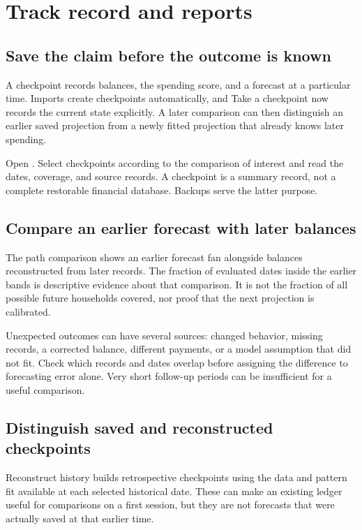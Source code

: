 \chapter{Track record and reports}\label{ch:track}
\section{Save the claim before the outcome is known}
A checkpoint records balances, the spending score, and a forecast at a particular time. Imports create checkpoints automatically, and Take a checkpoint now records the current state explicitly. A later comparison can then distinguish an earlier saved projection from a newly fitted projection that already knows later spending.

Open . Select checkpoints according to the comparison of interest and read the dates, coverage, and source records. A checkpoint is a summary record, not a complete restorable financial database. Backups serve the latter purpose.

\section{Compare an earlier forecast with later balances}
The path comparison shows an earlier forecast fan alongside balances reconstructed from later records. The fraction of evaluated dates inside the earlier bands is descriptive evidence about that comparison. It is not the fraction of all possible future households covered, nor proof that the next projection is calibrated.

Unexpected outcomes can have several sources: changed behavior, missing records, a corrected balance, different payments, or a model assumption that did not fit. Check which records and dates overlap before assigning the difference to forecasting error alone. Very short follow-up periods can be insufficient for a useful comparison.

\section{Distinguish saved and reconstructed checkpoints}
Reconstruct history builds retrospective checkpoints using the data and pattern fit available at each selected historical date. These can make an existing ledger useful for comparisons on a first session, but they are not forecasts that were actually saved at that earlier time.

